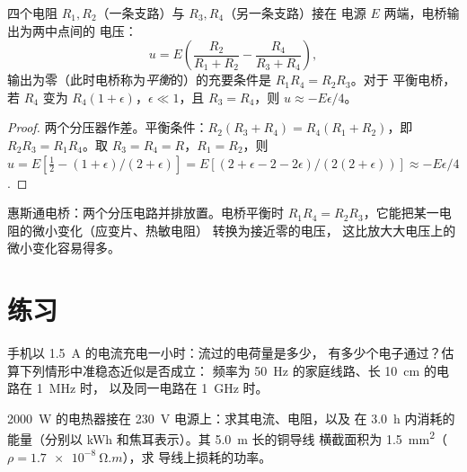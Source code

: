 \begin{proposition}[惠斯通电桥]\label{prop:b1:dc-circuits:wheatstone}
四个电阻 $R_1, R_2$（一条支路）与 $R_3, R_4$（另一条支路）接在
电源 $E$ 两端，电桥输出为两中点间的
电压：
\[
u = E\left(\frac{R_2}{R_1 + R_2} - \frac{R_4}{R_3 + R_4}\right),
\]
输出为零（此时电桥称为\emph{平衡}的）的充要条件是 $R_1R_4 = R_2R_3$。对于
平衡电桥，若 $R_4$ 变为 $R_4(1 + \epsilon)$，$\epsilon
\ll 1$，且 $R_3 = R_4$，则 $u \approx -E\epsilon/4$。
\end{proposition}

\begin{proof}
两个分压器作差。平衡条件：$R_2(R_3 + R_4) = R_4(R_1 +
R_2)$，即 $R_2R_3 = R_1R_4$。取 $R_3 = R_4 = R$，$R_1 = R_2$，则
$u = E[\tfrac12 - (1 + \epsilon)/(2 + \epsilon)] = E[(2 + \epsilon - 2 -
2\epsilon)/(2(2 + \epsilon))] \approx -E\epsilon/4$.
\end{proof}

\begin{omfigure}

{\small 惠斯通电桥：两个分压电路并排放置。电桥平衡时
$R_1R_4 = R_2R_3$，它能把某一电阻的微小变化（应变片、热敏电阻）
转换为接近零的电压，
这比放大大电压上的微小变化容易得多。}
\end{omfigure}

\section{练习}

\begin{exercise}[$\star$]\label{exo:b1:dc-circuits:1}
手机以 \qty{1.5}{A} 的电流充电一小时：流过的电荷量是多少，
有多少个电子通过？估算下列情形中准稳态近似是否成立：
频率为 \qty{50}{Hz} 的家庭线路、长 \qty{10}{cm} 的电路在 \qty{1}{MHz} 时，
以及同一电路在 \qty{1}{GHz} 时。
\end{exercise}

\begin{exercise}[$\star$]\label{exo:b1:dc-circuits:2}
\qty{2000}{W} 的电热器接在 \qty{230}{V} 电源上：求其电流、电阻，以及
在 \qty{3.0}{h} 内消耗的能量（分别以 kWh 和焦耳表示）。其 \qty{5.0}{m} 长的铜导线
横截面积为 \qty{1.5}{mm^2}（$\rho = \qty{1.7e-8}{\ohm.m}$），求
导线上损耗的功率。
\end{exercise}

